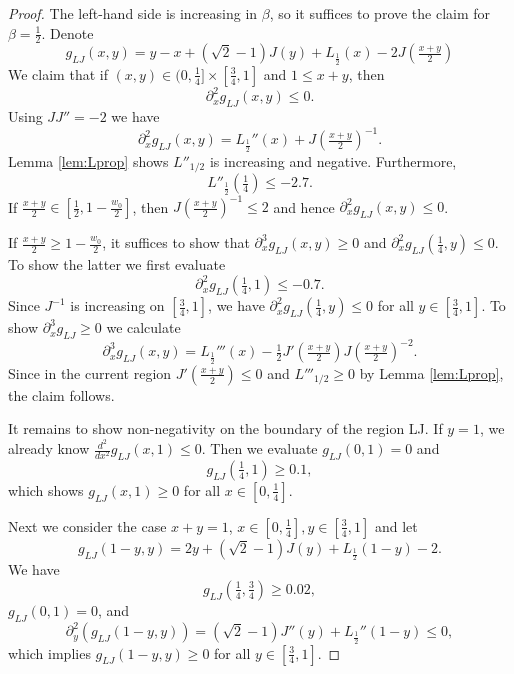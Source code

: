 \documentclass[12pt]{amsart}
\theoremstyle{plain}
\theoremstyle{definition}
\theoremstyle{remark}
\numberwithin{equation}{section}
\begin{document}
\begin{proof}
The left-hand side is increasing in $\beta$, so it suffices to prove the claim for $\beta=\tfrac{1}{2}$. 
    Denote 
    \[g_{LJ}(x,y) = y-x + (\sqrt{2}-1) J(y) + L_{\frac{1}{2}}(x) -2J(\tfrac{x+y}{2})\]
We claim that  if $(x,y)\in (0,\tfrac{1}{4}]\times [\tfrac{3}{4},1]$ and $1\leq x+y$, 
then  \[\partial^2_xg_{LJ}(x,y)\leq 0.\]
Using  $JJ''=-2$ we have
 \[\partial^2_xg_{LJ} (x,y) =  
 L_{\frac{1}{2}}''(x) +J(\tfrac{x+y}{2})^{-1}.\]
Lemma \ref{lem:Lprop}  shows  $L''_{1/2}$ is increasing and negative. 
Furthermore, 
\begin{equation}
L''_{\tfrac{1}{2}}(\tfrac{1}{4})\leq -2.7. 
\end{equation}
If $\tfrac{x+y}{2}\in [\tfrac{1}{2},1-\tfrac{w_0}{2}]$, then $ J(\tfrac{x+y}{2})^{-1}\leq 2$ and hence $\partial^2_xg_{LJ} (x,y)\leq 0$. 

If $\tfrac{x+y}{2}\geq  1-\tfrac{w_0}{2}$, it suffices to show that 
$\partial^3_xg_{LJ}(x,y) \geq 0$ and   
  $\partial^2_xg_{LJ} (\tfrac{1}{4},y) \leq 0 $.
  To show the latter we first evaluate 
\begin{equation}
\partial^2_xg_{LJ} (\tfrac{1}{4},1) \leq -0.7.     
\end{equation}
  Since $J^{-1}$ is increasing on $[\tfrac{3}{4},1]$, we have $\partial^2_xg_{LJ} (\tfrac{1}{4},y) \leq 0 $  for all $y\in [\tfrac{3}{4},1]$. 
To show $\partial^3_xg_{LJ}\geq 0$ we   calculate
  \[\partial^3_xg_{LJ}(x,y) =  L_{\frac{1}{2}}'''(x) -\tfrac{1}{2}J'(\tfrac{x+y}{2}) J(\tfrac{x+y}{2})^{-2}.\]
  Since in the current region $J'(\tfrac{x+y}{2})\leq 0$ and $L'''_{1/2}\ge 0$ by Lemma \ref{lem:Lprop}, the claim follows.

It remains to show non-negativity on the boundary of the region LJ. If $y=1$, we already know $\tfrac{d^2}{dx^2}g_{LJ}(x,1)\leq 0$. Then we evaluate $g_{LJ}(0,1)=0$ and 
\begin{equation}
g_{LJ}(\tfrac{1}{4},1)\geq 0.1,
\end{equation}
 which shows $g_{LJ}(x,1)\geq 0$ for all $x\in [0,\tfrac{1}{4}]$.

Next we consider the case $x+y=1$, $x\in [0,\tfrac{1}{4}], y\in [\tfrac{3}{4},1]$ and let
\[g_{LJ}(1-y,y) = 2y+(\sqrt{2}-1) J(y)+L_{\frac{1}{2}}(1-y)-2.\]
We have 
\begin{equation}
g_{LJ}(\tfrac{1}{4},\tfrac{3}{4})\geq 0.02,
\end{equation}
$g_{LJ}(0,1)= 0$, and 
    \[\partial^2_y (g_{LJ}(1-y,y)) = (\sqrt{2}-1) J''(y) + L_{\frac{1}{2}}''(1-y)\leq 0,\]
which implies $g_{LJ}(1-y,y)\geq 0$ for all $y\in [\tfrac{3}{4},1]$.



\end{proof}
\end{document}
